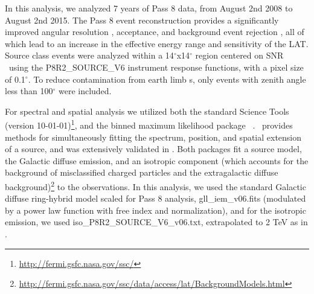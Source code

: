 In this analysis, we  analyzed 7 years of Pass 8 data, from August 2nd 2008  to August 2nd 2015. The Pass 8 event reconstruction provides a significantly improved angular resolution , acceptance, and background event rejection \citep{atwood13b,atwood13}, all of which lead to an increase in the effective energy range and sensitivity of the LAT. Source class events were analyzed within a 14$^\circ$x14$^\circ$ region centered on SNR \Gone~using the P8R2\_SOURCE\_V6 instrument response functions, with a pixel size of 0.1$^{\circ}$. To reduce contamination from earth limb \gam{}s, only events with zenith angle less than 100$^{\circ}$ were included.

For spectral and spatial analysis we utilized both the standard \Fermi{} Science Tools (version 10-01-01)\footnote[1]{\url{http://fermi.gsfc.nasa.gov/ssc/}}, and the binned maximum likelihood package \ptlike~\citep{Kerr10}. \ptlike~provides methods for simultaneously fitting the spectrum, position, and spatial extension of a source, and was extensively validated in \cite{Lande12}. Both packages fit a source model, the Galactic diffuse emission, and an isotropic component (which accounts for the background of misclassified charged particles and the extragalactic diffuse \gam{}  background)\footnote[2]{\url{http://fermi.gsfc.nasa.gov/ssc/data/access/lat/BackgroundModels.html}} to the observations. In this analysis, we used the standard Galactic diffuse ring-hybrid model scaled for Pass 8 analysis, gll{\_}iem{\_}v06.fits (modulated by a power law function with free index and normalization), and for the isotropic emission,  we used iso{\_}P8R2{\_}SOURCE{\_}V6{\_}v06.txt, extrapolated to 2 TeV as in \cite{2FHL}.

